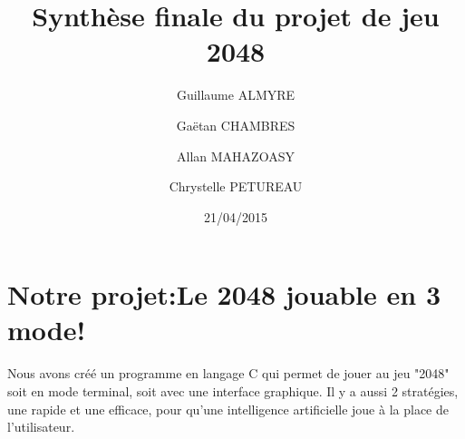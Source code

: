 \documentclass{report}
\begin{document}
\lstset{language=C}

\title{Synthèse finale du projet de jeu 2048}
\author{Guillaume ALMYRE 
\and
Ga\"{e}tan CHAMBRES
\and
Allan MAHAZOASY
\and 
Chrystelle PETUREAU}
\date{21/04/2015}

\maketitle

\tableofcontents

\chapter{Notre projet:Le 2048 jouable en 3 mode!}
Nous avons créé un programme en langage C qui permet de jouer au jeu "2048" soit en mode terminal, soit avec une interface graphique. Il y a aussi 2 stratégies, une rapide et une efficace, pour qu'une intelligence artificielle joue à la place de l'utilisateur.
\end{document}
